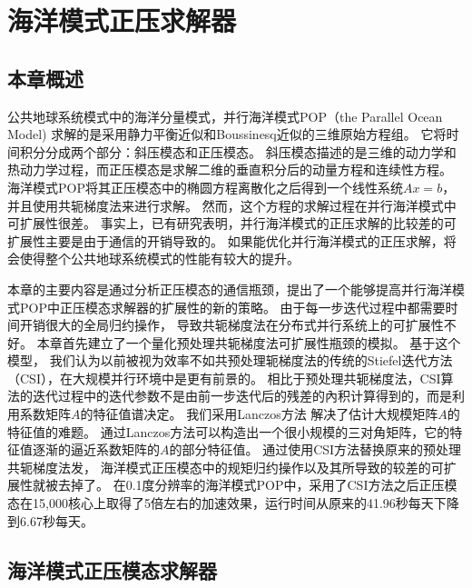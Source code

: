 \chapter{海洋模式正压求解器}
\label{cha:barosSolver}

\section{本章概述}

公共地球系统模式中的海洋分量模式，并行海洋模式POP（the Parallel Ocean Model) 求解的是采用静力平衡近似和Boussinesq近似的三维原始方程组。 
它将时间积分分成两个部分：斜压模态和正压模态。 
斜压模态描述的是三维的动力学和热动力学过程，而正压模态是求解二维的垂直积分后的动量方程和连续性方程。
海洋模式POP将其正压模态中的椭圆方程离散化之后得到一个线性系统$Ax=b$，并且使用共轭梯度法来进行求解。
然而，这个方程的求解过程在并行海洋模式中可扩展性很差。
事实上，已有研究表明，并行海洋模式的正压求解的比较差的可扩展性主要是由于通信的开销导致的\cite{Worley:2011:PCE:2063384.2063457}。 
如果能优化并行海洋模式的正压求解，将会使得整个公共地球系统模式的性能有较大的提升\cite{dennis2012computational}。 


本章的主要内容是通过分析正压模态的通信瓶颈，提出了一个能够提高并行海洋模式POP中正压模态求解器的扩展性的新的策略。 
由于每一步迭代过程中都需要时间开销很大的全局归约操作， 导致共轭梯度法在分布式并行系统上的可扩展性不好。 
本章首先建立了一个量化预处理共轭梯度法可扩展性瓶颈的模拟。
基于这个模型， 我们认为以前被视为效率不如共预处理轭梯度法的传统的Stiefel迭代方法（CSI），在大规模并行环境中是更有前景的。
相比于预处理共轭梯度法，CSI算法的迭代过程中的迭代参数不是由前一步迭代后的残差的內积计算得到的，而是利用系数矩阵$A$的特征值谱决定。 
我们采用Lanczos方法 解决了估计大规模矩阵$A$的特征值的难题。 
通过Lanczos方法可以构造出一个很小规模的三对角矩阵，它的特征值逐渐的逼近系数矩阵的$A$的部分特征值。 
通过使用CSI方法替换原来的预处理共轭梯度法发， 海洋模式正压模态中的规矩归约操作以及其所导致的较差的可扩展性就被去掉了。 
在0.1度分辨率的海洋模式POP中，采用了CSI方法之后正压模态在15,000核心上取得了5倍左右的加速效果，运行时间从原来的41.96秒每天下降到6.67秒每天。 





\section{海洋模式正压模态求解器}
\label{solver:baro}

